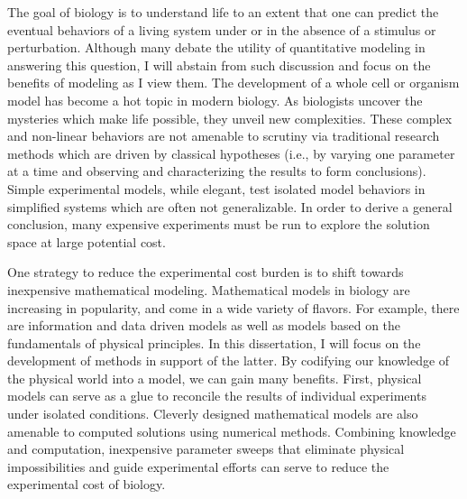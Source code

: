 
\par The goal of biology is to understand life to an extent that one can predict the eventual behaviors of a living system under or in the absence of a stimulus or perturbation.
Although many debate the utility of quantitative modeling in answering this question, I will abstain from such discussion and focus on the benefits of modeling as I view them.
The development of a whole cell or organism model has become a hot topic in modern biology\cite{Roberts2014}.
As biologists uncover the mysteries which make life possible, they unveil new complexities\cite{CheckHayden2010}.
These complex and non-linear behaviors are not amenable to scrutiny via traditional research methods which are driven by classical hypotheses (i.e., by varying one parameter at a time and observing and characterizing the results to form conclusions).
Simple experimental models, while elegant, test isolated model behaviors in simplified systems which are often not generalizable.
In order to derive a general conclusion, many expensive experiments must be run to explore the solution space at large potential cost.

\par One strategy to reduce the experimental cost burden is to shift towards inexpensive mathematical modeling.
Mathematical models in biology are increasing in popularity, and come in a wide variety of flavors\cite{Gunawardena2014}.
For example, there are information and data driven models as well as models based on the fundamentals of physical principles.
In this dissertation, I will focus on the development of methods in support of the latter.
By codifying our knowledge of the physical world into a model, we can gain many benefits.
First, physical models can serve as a glue to reconcile the results of individual experiments under isolated conditions.
Cleverly designed mathematical models are also amenable to computed solutions using numerical methods.
Combining knowledge and computation, inexpensive parameter sweeps that eliminate physical impossibilities and guide experimental efforts can serve to reduce the experimental cost of biology.


